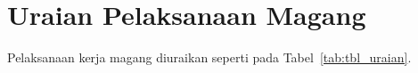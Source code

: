 










\section{Uraian Pelaksanaan Magang}
Pelaksanaan kerja magang diuraikan seperti pada Tabel~\ref{tab:tbl_uraian}.

